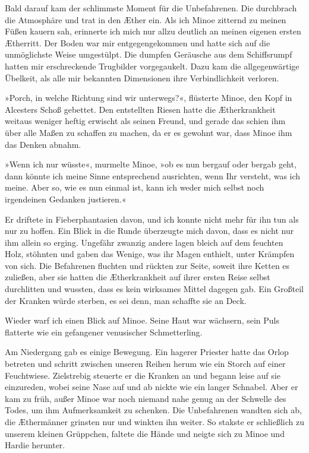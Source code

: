 \bigpar

Bald darauf kam der schlimmste Moment für die Unbefahrenen. Die
 durchbrach die Atmosphäre und trat in den Æther
ein. Als ich Minoe zitternd zu meinen Füßen kauern sah, erinnerte
ich mich nur allzu deutlich an meinen eigenen ersten Ætherritt. Der
Boden war mir entgegengekommen und hatte sich auf die unmöglichste
Weise umgestülpt. Die dumpfen Geräusche aus dem Schiffsrumpf hatten
mir erschreckende Trugbilder vorgegaukelt. Dazu kam die
allgegenwärtige Übelkeit, als alle mir bekannten Dimensionen ihre
Verbindlichkeit verloren.

»Porch, in welche Richtung sind wir unterwegs?«, flüsterte Minoe,
den Kopf in Alcesters Schoß gebettet. Den entstellten Riesen hatte
die Ætherkrankheit weitaus weniger heftig erwischt als seinen
Freund, und gerade das schien ihm über alle Maßen zu schaffen zu
machen, da er es gewohnt war, dass Minoe ihm das Denken abnahm.

»Wenn ich nur wüsste«, murmelte Minoe, »ob es nun bergauf oder
bergab geht, dann könnte ich meine Sinne entsprechend ausrichten,
wenn Ihr versteht, was ich meine. Aber so, wie es nun einmal ist,
kann ich weder mich selbst noch irgendeinen Gedanken justieren.«

Er driftete in Fieberphantasien davon, und ich konnte nicht mehr
für ihn tun als nur zu hoffen. Ein Blick in die Runde überzeugte
mich davon, dass es nicht nur ihm allein so erging. Ungefähr
zwanzig andere lagen bleich auf dem feuchten Holz, stöhnten und
gaben das Wenige, was ihr Magen enthielt, unter Krämpfen von sich.
Die Befahrenen fluchten und rückten zur Seite, soweit ihre Ketten
es zuließen, aber sie hatten die Ætherkrankheit auf ihrer ersten
Reise selbst durchlitten und wussten, dass es kein wirksames Mittel
dagegen gab. Ein Großteil der Kranken würde sterben, es sei denn,
man schaffte sie an Deck.

Wieder warf ich einen Blick auf Minoe. Seine Haut war wächsern,
sein Puls flatterte wie ein gefangener venusischer Schmetterling.

\bigpar

Am Niedergang gab es einige Bewegung. Ein hagerer Priester hatte
das Orlop betreten und schritt zwischen unseren Reihen herum wie
ein Storch auf einer Feuchtwiese. Zielstrebig steuerte er die
Kranken an und begann leise auf sie einzureden, wobei seine Nase
auf und ab nickte wie ein langer Schnabel. Aber er kam zu früh,
außer Minoe war noch niemand nahe genug an der Schwelle des Todes,
um ihm Aufmerksamkeit zu schenken. Die Unbefahrenen wandten sich
ab, die Æthermänner grinsten nur und winkten ihn weiter. So stakste
er schließlich zu unserem kleinen Grüppchen, faltete die Hände und
neigte sich zu Minoe und Hardie herunter.

